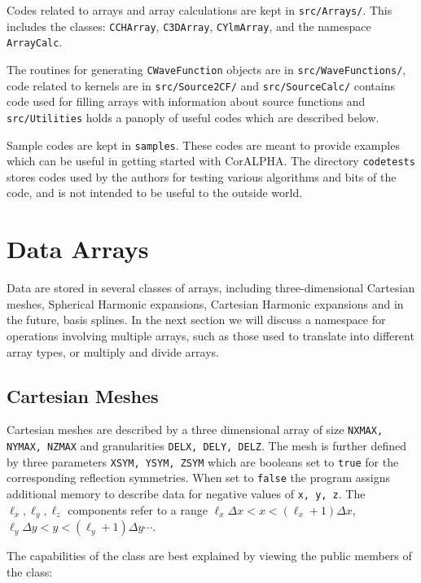 \documentclass[10pt]{article}
\newcommand{\projectname}{CorALPHA}
\begin{document}
Codes related to arrays and array calculations are kept in {\tt src/Arrays/}. This includes the classes: {\tt CCHArray}, {\tt C3DArray}, {\tt CYlmArray}, and the namespace {\tt ArrayCalc}.

The routines for generating {\tt CWaveFunction} objects are in {\tt src/WaveFunctions/}, code related to kernels are in {\tt src/Source2CF/} and {\tt src/SourceCalc/} contains code used for filling arrays with information about source functions and {\tt src/Utilities} holds a panoply of useful codes which are described below.

Sample codes are kept in {\tt samples}. These codes are meant to provide examples which can be useful in getting started with \projectname. The directory {\tt codetests} stores codes used by the authors for testing various algorithms and bits of the code, and is not intended to be useful to the outside world.

\section{Data Arrays}
\label{sec:arrays}

Data are stored in several classes of arrays, including three-dimensional Cartesian meshes, Spherical Harmonic expansions, Cartesian Harmonic expansions and in the future, basis splines. In the next section we will discuss a namespace for operations involving multiple arrays, such as those used to translate into different array types, or multiply and divide arrays.

\subsection{Cartesian Meshes}

Cartesian meshes are described by a three dimensional array of size {\tt NXMAX, NYMAX, NZMAX} and granularities {\tt DELX, DELY, DELZ}. The mesh is further defined by three parameters {\tt XSYM, YSYM, ZSYM} which are booleans set to {\tt true} for the corresponding reflection symmetries. When set to {\tt false} the program assigns additional memory to describe data for negative values of {\tt x, y, z}. The $\ell_x,\ell_y,\ell_z$ components refer to a range $\ell_x\Delta x<x<(\ell_x+1)\Delta x$, $\ell_y\Delta y<y<(\ell_y+1)\Delta y\cdots$.

The capabilities of the class are best explained by viewing the public members of the class:\\
\end{document}
